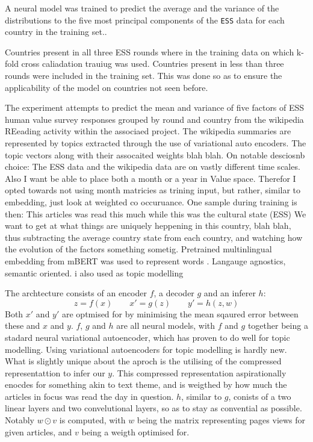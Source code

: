 A neural model was trained to predict the average and the variance of the distributions to the five most principal components of the \texttt{ESS} data for each country in the training set..

Countries present in all three ESS rounds where in the training data on which k-fold cross caliadation trauiug was used.
Countries present in less than three rounds were included in the training set. This was done so as to
ensure the applicability of the model on countries not seen before.

The experiment attempts to predict the mean and variance of five factors of ESS human value survey responses grouped by round and country from the wikipedia REeading activity within the associaed project.
The wikipedia summaries are represented by topics extracted through the use of variational auto encoders. The topic vectors along with their assocaited weights blah blah.
On notable desciosnb choice: The ESS data and the wikipedia data are on vastly different time scales. Also I want be able to place both a month or a year in Value space. Therefor I opted towards not using month matricies as trining input, but rather, similar to embedding, just look at weighted co occuruance. One sample during training is then: This articles was read this much while this was the cultural state (ESS)
We want to get at what things are uniquely heppening in this country, blah blah, thus subtracting the average country state from each country, and watching how the evolution of the factors something sometig.
Pretrained multinlingual embedding from mBERT was used to represent words \cite{artetxe-etal-2017-learning}. Langauge agnostics, semantic oriented.
\cite{kingma2013auto} i also used as topic modelling
\cite{DBLP:journals/corr/abs-1810-04805}
\cite{Wu2020}

The archtecture consists of an encoder $f$, a decoder $g$ and an inferer $h$:
$$
z  = f(x) \qquad
x' = g(z) \qquad
y' = h(z, w)
$$
Both $x'$ and $y'$ are optmised for by minimising the mean sqaured error between these and $x$ and $y$.
$f$, $g$ and $h$ are all neural models, with $f$ and $g$ together being a stadard neural variational autoencoder, which has proven to do well for topic modelling.
Using variational autoencoders for topic modelling is hardly new. What is slightly unique about the aproch is the utilising of the compressed representattion to infer our $y$.
This compressed representation aspirationally enocdes for something akin to text theme, and is weigthed by how much the articles in focus was read the day in question.
$h$, similar to $g$, conists of a two linear layers and two convelutional layers, so as to stay as convential as possible.
Notably $w \odot v$ is computed, with $w$ being the matrix representing pages views for given articles, and $v$ being a weigth optimised for.

